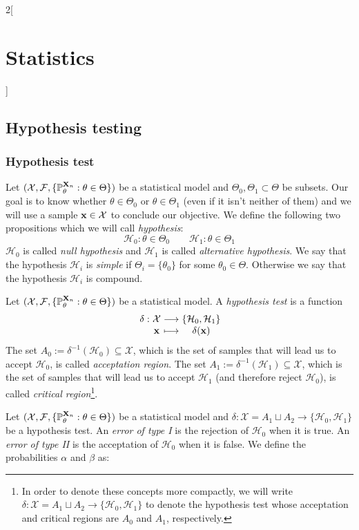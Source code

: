 \documentclass[../../../main.tex]{subfiles}
\begin{document}
\begin{multicols}{2}[\section{Statistics}]
  \subsection{Hypothesis testing}
  \subsubsection{Hypothesis test}
  \begin{definition}
    Let $(\mathcal{X},\mathcal{F},\{\mathbb{P}_\theta^{\boldsymbol{\mathrm{X}}_n}:\theta\in\Theta\})$ be a statistical model and $\Theta_0,\Theta_1\subset\Theta$ be subsets. Our goal is to know whether $\theta\in\Theta_0$ or $\theta\in\Theta_1$ (even if it isn't neither of them) and we will use a sample $\boldsymbol{\mathrm{x}}\in\mathcal{X}$ to conclude our objective. We define the following two propositions which we will call \emph{hypothesis}:
    $$\mathcal{H}_0:\theta\in\Theta_0\qquad\mathcal{H}_1:\theta\in\Theta_1$$
    $\mathcal{H}_0$ is called \emph{null hypothesis} and $\mathcal{H}_1$ is called \emph{alternative hypothesis}. We say that the hypothesis $\mathcal{H}_i$ is \emph{simple} if $\Theta_i=\{\theta_0\}$ for some $\theta_0\in\Theta$. Otherwise we say that the hypothesis $\mathcal{H}_i$ is compound.
  \end{definition}
  \begin{definition}
    Let $(\mathcal{X},\mathcal{F},\{\mathbb{P}_\theta^{\boldsymbol{\mathrm{X}}_n}:\theta\in\Theta\})$ be a statistical model. A \emph{hypothesis test} is a function $$\function{\delta}{\mathcal{X}}{\{\mathcal{H}_0,\mathcal{H}_1\}}{\vf{x}}{\delta(\vf{x})}$$
    The set $A_0:=\delta^{-1}(\mathcal{H}_0)\subseteq \mathcal{X}$, which is the set of samples that will lead us to accept $\mathcal{H}_0$, is called \emph{acceptation region}. The set $A_1:=\delta^{-1}(\mathcal{H}_1)\subseteq \mathcal{X}$, which is the set of samples that will lead us to accept $\mathcal{H}_1$ (and therefore reject $\mathcal{H}_0$), is called \emph{critical region}\footnote{In order to denote these concepts more compactly, we will write $\delta:\mathcal{X}=A_1\sqcup A_2\rightarrow\{\mathcal{H}_0,\mathcal{H}_1\}$ to denote the hypothesis test whose acceptation and critical regions are $A_0$ and $A_1$, respectively.}.
  \end{definition}
  \begin{definition}
    Let $(\mathcal{X},\mathcal{F},\{\mathbb{P}_\theta^{\boldsymbol{\mathrm{X}}_n}:\theta\in\Theta\})$ be a statistical model and $\delta:\mathcal{X}=A_1\sqcup A_2\rightarrow\{\mathcal{H}_0,\mathcal{H}_1\}$ be a hypothesis test. An \emph{error of type I} is the rejection of $\mathcal{H}_0$ when it is true. An \emph{error of type II} is the acceptation of $\mathcal{H}_0$ when it is false. We define the probabilities $\alpha$ and $\beta$ as:

\end{definition}
\end{multicols}
\end{document}
